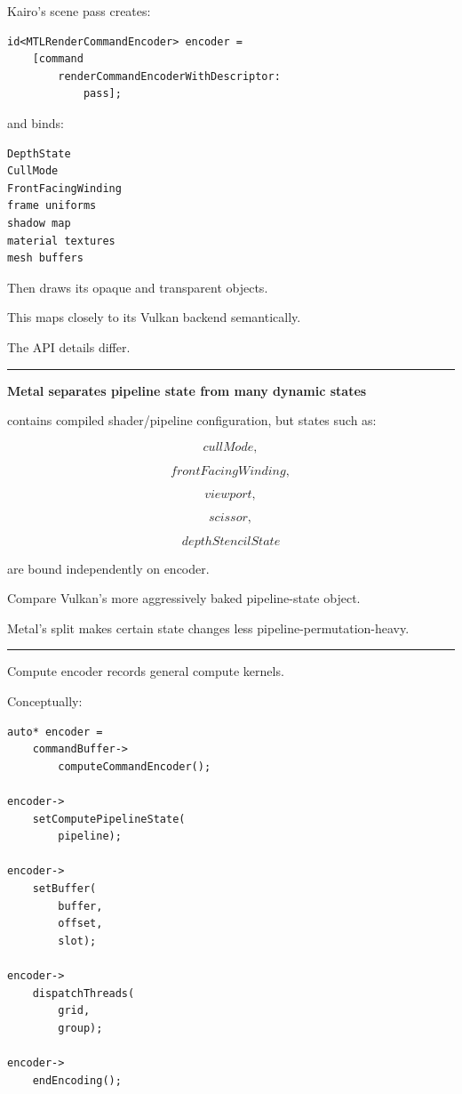 Kairo's scene pass creates:

\begin{verbatim}
id<MTLRenderCommandEncoder> encoder =
    [command
        renderCommandEncoderWithDescriptor:
            pass];
\end{verbatim}

and binds:

\begin{verbatim}
DepthState
CullMode
FrontFacingWinding
frame uniforms
shadow map
material textures
mesh buffers
\end{verbatim}

Then draws its opaque and transparent objects.

This maps closely to its Vulkan backend semantically.

The API details differ.

\begin{center}\rule{0.5\linewidth}{0.5pt}\end{center}

\textbf{Metal separates pipeline state from many dynamic states}

 contains compiled shader/pipeline configuration, but states such as:

\[
cullMode,
\]

\[
frontFacingWinding,
\]

\[
viewport,
\]

\[
scissor,
\]

\[
depthStencilState
\]

are bound independently on encoder.

Compare Vulkan's more aggressively baked pipeline-state object.

Metal's split makes certain state changes less pipeline-permutation-heavy.

\begin{center}\rule{0.5\linewidth}{0.5pt}\end{center}

\textbf{}

Compute encoder records general compute kernels.

Conceptually:

\begin{verbatim}
auto* encoder =
    commandBuffer->
        computeCommandEncoder();

encoder->
    setComputePipelineState(
        pipeline);

encoder->
    setBuffer(
        buffer,
        offset,
        slot);

encoder->
    dispatchThreads(
        grid,
        group);

encoder->
    endEncoding();
\end{verbatim}

